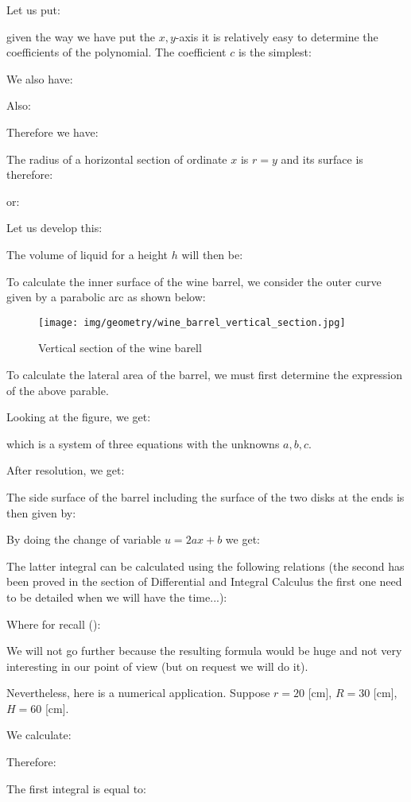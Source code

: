 {	Let us put:
	
	given the way we have put the $x, y$-axis it is relatively easy to determine the coefficients of the polynomial. The coefficient $c$ is the simplest:
	
	We also have:
	
	Also:
	
	Therefore we have:
	
	The radius of a horizontal section of ordinate $x$ is $r=y$ and its surface is therefore:
	
	or:
	
	Let us develop this:
	
	The volume of liquid for a height $h$ will then be:
	
	To calculate the inner surface of the wine barrel, we consider the outer curve given by a parabolic arc as shown below:
	\begin{figure}[H]
		\centering
		\texttt{[image: img/geometry/wine\_barrel\_vertical\_section.jpg]}
		\caption[]{Vertical section of the wine barell}
	\end{figure}
	To calculate the lateral area of the barrel, we must first determine the expression of the above parable.
	
	Looking at the figure, we get:
	
	which is a system of three equations with the unknowns $a,b,c$.
	
	After resolution, we get:
	
	The side surface of the barrel including the surface of the two disks at the ends is then given by:
	
	By doing the change of variable $u=2ax+b$ we get:
	
	The latter integral can be calculated using the following relations (the second has been proved in the section of Differential and Integral Calculus the first one need to be detailed when we will have the time...):
	
	Where for recall ():
	
	We will not go further because the resulting formula would be huge and not very interesting in our point of view (but on request we will do it).	
	
	Nevertheless, here is a numerical application. Suppose $r=20$ [cm], $R=30$ [cm], $H=60$ [cm].
	
	We calculate:
	
	Therefore:
	
	The first integral is equal to:
	
}
